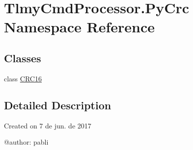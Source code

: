 \hypertarget{namespace_tlmy_cmd_processor_1_1_py_crc}{}\section{Tlmy\+Cmd\+Processor.\+Py\+Crc Namespace Reference}
\label{namespace_tlmy_cmd_processor_1_1_py_crc}
\subsection*{Classes}
\begin{DoxyCompactItemize}
\item 
class \hyperlink{class_tlmy_cmd_processor_1_1_py_crc_1_1_c_r_c16}{C\+R\+C16}
\end{DoxyCompactItemize}


\subsection{Detailed Description}
\begin{DoxyVerb}Created on 7 de jun. de 2017

@author: pabli
\end{DoxyVerb}
 